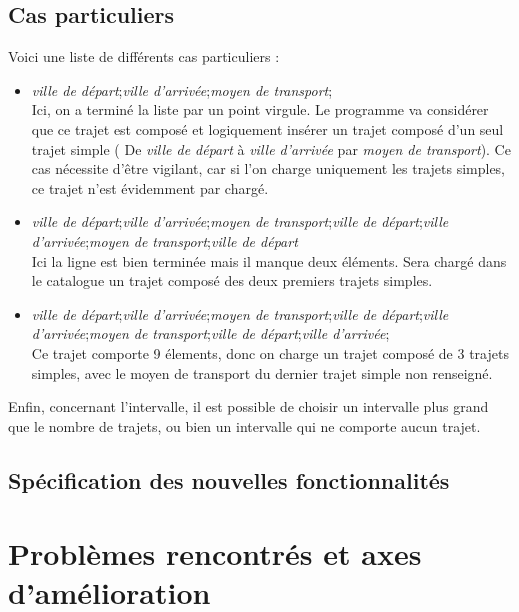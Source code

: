 \documentclass[a4paper]{article}
\begin{document}
\subsection{Cas particuliers}
Voici une liste de différents cas particuliers : 
\begin{itemize}
  \item \textit{ville de départ};\textit{ville d'arrivée};\textit{moyen de transport};\\
  Ici, on a terminé la liste par un point virgule. Le programme va considérer que ce trajet est composé et logiquement insérer un trajet composé d'un seul trajet simple ( De \textit{ville de départ} à \textit{ville d'arrivée} par \textit{moyen de transport}). Ce cas nécessite d'être vigilant, car si l'on charge uniquement les trajets simples, ce trajet n'est évidemment par chargé.
  \item \textit{ville de départ};\textit{ville d'arrivée};\textit{moyen de transport};\textit{ville de départ};\textit{ville d'arrivée};\textit{moyen de transport};\textit{ville de départ} \\
  Ici la ligne est bien terminée mais il manque deux éléments. Sera chargé dans le catalogue un trajet composé des deux premiers trajets simples.
  \item \textit{ville de départ};\textit{ville d'arrivée};\textit{moyen de transport};\textit{ville de départ};\textit{ville d'arrivée};\textit{moyen de transport};\textit{ville de départ};\textit{ville d'arrivée};\\
  Ce trajet comporte 9 élements, donc on charge un trajet composé de 3 trajets simples, avec le moyen de transport du dernier trajet simple non renseigné.
\end{itemize}  

Enfin, concernant l'intervalle, il est possible de choisir un intervalle plus grand que le nombre de trajets, ou bien un intervalle qui ne comporte aucun trajet.
 

\subsection{Spécification des nouvelles fonctionnalités}



\section{Problèmes rencontrés et axes d'amélioration}
\end{document}
